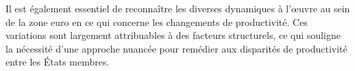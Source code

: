 Il est également essentiel de reconnaître les diverses dynamiques à l'œuvre au sein de la zone euro en ce qui concerne les changements de productivité. 
Ces variations sont largement attribuables à des facteurs structurels, ce qui souligne la nécessité d'une approche nuancée pour remédier aux disparités de productivité entre les États membres.








